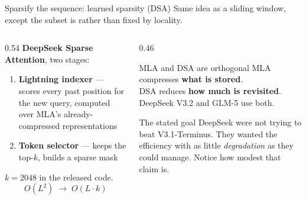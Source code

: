 \documentclass[aspectratio=169,10pt]{beamer}
\begin{document}
\begin{frame}{Sparsify the sequence: learned sparsity (DSA)}
  Same idea as a sliding window, except the subset is  rather than
  fixed by locality.
  \vspace{0.5em}
  \begin{columns}[T]
    \begin{column}{0.54\textwidth}
      \textbf{DeepSeek Sparse Attention}, two stages:
      \begin{enumerate}
        \item \textbf{Lightning indexer} --- scores every past position for the
          new query, computed over MLA's already-compressed representations
        \item \textbf{Token selector} --- keeps the top-$k$, builds a sparse mask
      \end{enumerate}
      \vspace{0.4em}
      $k = 2048$ in the released code.
      \[
        O(L^2) \;\longrightarrow\; O(L\cdot k)
      \]
    \end{column}
    \begin{column}{0.46\textwidth}
      \begin{block}{MLA and DSA are orthogonal}
        \small
        MLA compresses \textbf{what is stored}.\\
        DSA reduces \textbf{how much is revisited}.\\
        DeepSeek V3.2 and GLM-5 use both.
      \end{block}
      \begin{block}{The stated goal}
        \small
        DeepSeek were not trying to beat V3.1-Terminus. They wanted the
        efficiency with as little \emph{degradation} as they could manage.
        Notice how modest that claim is.
      \end{block}
    \end{column}
  \end{columns}
\end{frame}
\end{document}
